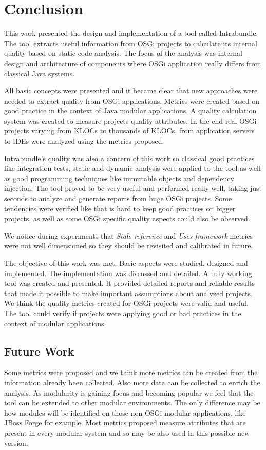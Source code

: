 \chapter{Conclusion}
This work presented the design and implementation of a tool called Intrabundle. The tool extracts useful information from OSGi projects to calculate its internal quality based on static code analysis. The focus of the analysis was internal design and architecture of components where OSGi application really differs from classical Java systems. 

All basic concepts were presented and it became clear that new approaches were needed to extract quality from OSGi applications. Metrics were created based on good practice in the context of Java modular applications. A quality calculation system was created to measure projects quality attributes. In the end real OSGi projects varying from KLOCs to thousands of KLOCs, from application servers to IDEs were analyzed using the metrics proposed.

Intrabundle's quality was also a concern of this work so classical good practices like integration tests, static and dynamic analysis were applied to the tool as well as good programming techniques like immutable objects and dependency injection.      
The tool proved to be very useful and performed really well, taking just seconds to analyze and generate reports from huge OSGi projects. Some tendencies were verified like that is hard to keep good practices on bigger projects, as well as some OSGi specific quality aspects could also be observed. 

We notice during experiments that \emph{Stale reference} and \emph{Uses framework} metrics were not well dimensioned so they should be revisited and calibrated in future.

The objective of this work was met. Basic aspects were studied, designed and implemented. The implementation was discussed and detailed. A fully working tool was created and presented. It provided detailed reports and reliable results that made it possible to make important assumptions about analyzed projects. We think the quality metrics created for OSGi projects were valid and useful. The tool could verify if projects were applying good or bad practices in the context of modular applications. 

\section{Future Work}
Some metrics were proposed and we think more metrics can be created from the information already been collected. Also more data can be collected to enrich the analysis. 
As modularity is gaining focus and becoming popular we feel that the tool can be extended to other modular environments. The only difference may be how modules will be identified on those non OSGi modular applications, like JBoss Forge for example. Most metrics proposed measure attributes that are present in every modular system and so may be also used in this possible new version. 

